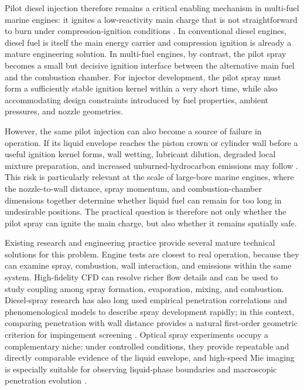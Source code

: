\documentclass[english, 12pt, a4paper, elec, utf8, a-2b, online]{aaltothesis}
\begin{document}
Pilot diesel injection therefore remains a critical enabling mechanism in multi-fuel marine engines: 
it ignites a low-reactivity main charge that is not straightforward to burn under compression-ignition conditions 
\cite{wingd_xdf_manual_2021,classnk_methanol_2024}. 
In conventional diesel engines, diesel fuel is itself the main energy carrier 
and compression ignition is already a mature engineering solution. 
In multi-fuel engines, by contrast, 
the pilot spray becomes a small but decisive ignition interface between the alternative main fuel and the combustion chamber. 
For injector development, the pilot spray must form a sufficiently stable ignition kernel within a very short time, 
while also accommodating design constraints introduced by fuel properties, ambient pressures, and nozzle geometries.

However, the same pilot injection can also become a source of failure in operation. 
If its liquid envelope reaches the piston crown or cylinder wall before a useful ignition kernel forms, 
wall wetting, lubricant dilution, degraded local mixture preparation, 
and increased unburned-hydrocarbon emissions may follow \cite{peraza2022swi,ahmad2025fueldilution,MorieiraMotaPanao2010}. 
This risk is particularly relevant at the scale of large-bore marine engines, 
where the nozzle-to-wall distance, spray momentum, and combustion-chamber dimensions together determine 
whether liquid fuel can remain for too long in undesirable positions. 
The practical question is therefore not only whether the pilot spray can ignite the main charge, 
but also whether it remains spatially safe.

Existing research and engineering practice provide several mature technical solutions for this problem. 
Engine tests are closest to real operation, because they can examine spray, combustion, wall interaction, 
and emissions within the same system. 
High-fidelity CFD can resolve richer flow details and can be used to study coupling among spray formation, evaporation, mixing, and combustion. 
Diesel-spray research has also long used empirical penetration correlations and phenomenological models to describe spray development rapidly; 
in this context, comparing penetration with wall distance provides a natural first-order geometric criterion for impingement screening 
\cite{HiroyasuArai1990,NaberSiebers1996,Baumgarten2006MixFormation}. 
Optical spray experiments occupy a complementary niche: 
under controlled conditions, they provide repeatable and directly comparable evidence of the liquid envelope, 
and high-speed Mie imaging is especially suitable for observing liquid-phase boundaries and macroscopic penetration evolution 
\cite{Linne2013SprayImaging}.
\end{document}
